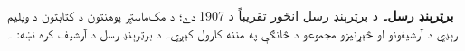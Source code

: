 \textbf{برټرېنډ رسل۔} د برټرېنډ رسل انځور تقريباً د 1907 دے؛ د مک‌ماسټر پوهنتون د کتابتون د ويليم رېډي د آرشيفونو او څېړنيزو مجموعو د څانګې په مننه کارول کېږي۔ د برټرېنډ رسل د آرشيف کره نښه: ۔
